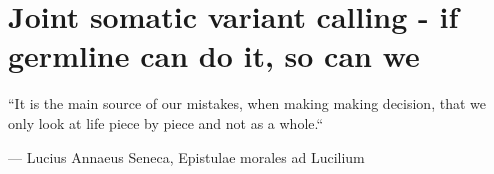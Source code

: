 \chapter[Joint somatic variant calling]{Joint somatic variant calling - if germline can do it, so can we}
\label{ch:variantcalling}

\epigraph{``It is the main source of our mistakes,  when making making decision, that we only look at life piece by piece and not as a whole.``}{--- \textup{Lucius Annaeus Seneca}, Epistulae morales ad Lucilium}










